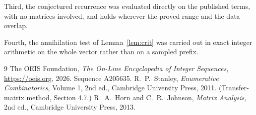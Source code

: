 \documentclass[11pt,a4paper]{article}
\theoremstyle{plain}
\theoremstyle{definition}
\begin{document}
Third, the conjectured recurrence was evaluated directly on the published terms, with no
matrices involved, and holds wherever the proved range and the data overlap.

Fourth, the annihilation test of Lemma~\ref{lem:crit} was carried out in exact integer
arithmetic on the whole vector rather than on a sampled prefix.

\begin{thebibliography}{9}
 The OEIS Foundation, \emph{The On-Line Encyclopedia of Integer
Sequences}, \url{https://oeis.org}, 2026. Sequence A205635.
 R.~P.~Stanley, \emph{Enumerative Combinatorics}, Volume 1, 2nd ed.,
Cambridge University Press, 2011. (Transfer-matrix method, Section 4.7.)
 R.~A.~Horn and C.~R.~Johnson, \emph{Matrix Analysis}, 2nd ed., Cambridge
University Press, 2013.
\end{thebibliography}
\end{document}
